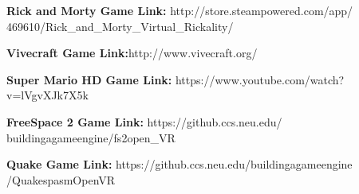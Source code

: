 \documentclass[journal]{IEEEtran}
\begin{document}
\begin{thebibliography}{10}
	\textbf{Rick and Morty Game Link:} http://store.steampowered.com/app/\hspace{1cm} 469610/Rick\_and\_Morty\_Virtual\_Rickality/
	
	\textbf{Vivecraft Game Link:}http://www.vivecraft.org/
	
	\textbf{Super Mario HD Game Link:} https://www.youtube.com/watch?v=lVgvXJk7X5k
	
	\textbf{FreeSpace 2 Game Link:} https://github.ccs.neu.edu/\hspace{1cm} buildingagameengine/fs2open\_VR
	
	\textbf{Quake Game Link:} https://github.ccs.neu.edu/buildingagameengine\hspace{1cm} /QuakespasmOpenVR
	


	
\end{thebibliography}
\end{document}

